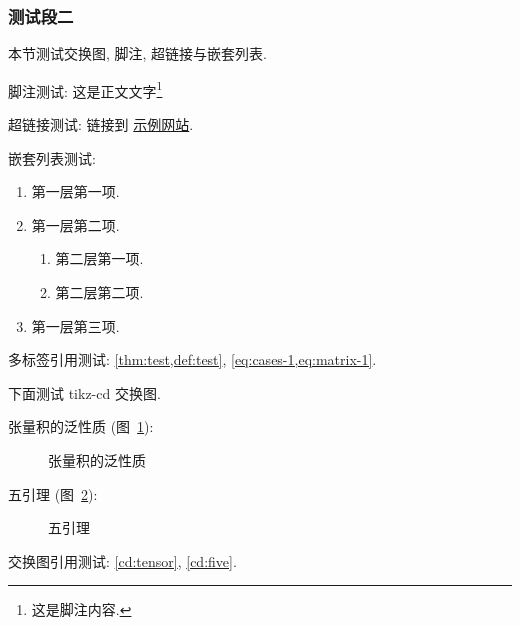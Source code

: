 \subsubsection{测试段二}

本节测试交换图, 脚注, 超链接与嵌套列表.

脚注测试: 这是正文文字\footnote{这是脚注内容.}

超链接测试: 链接到 \href{https://www.example.com}{示例网站}.

嵌套列表测试:
\begin{enumerate}
    \item 第一层第一项.
    \item 第一层第二项.
    \begin{enumerate}
        \item 第二层第一项.
        \item 第二层第二项.
    \end{enumerate}
    \item 第一层第三项.
\end{enumerate}

多标签引用测试: \cref{thm:test,def:test}, \cref{eq:cases-1,eq:matrix-1}.

\medskip

下面测试 tikz-cd 交换图.

张量积的泛性质 (图~\ref{cd:tensor}):

\begin{figure}[htbp]
    \centering
    \caption{张量积的泛性质}
    \label{cd:tensor}
\end{figure}

五引理 (图~\ref{cd:five}):

\begin{figure}[htbp]
    \centering
    \caption{五引理}
    \label{cd:five}
\end{figure}

交换图引用测试: \autoref{cd:tensor}, \autoref{cd:five}.

